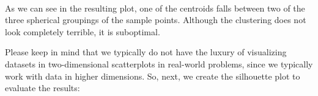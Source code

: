 \documentclass[11pt]{article}
\begin{document}
    \begin{center}
    \end{center}
    { \hspace*{\fill} \\}
    
    As we can see in the resulting plot, one of the centroids falls between
two of the three spherical groupings of the sample points. Although the
clustering does not look completely terrible, it is suboptimal.

Please keep in mind that we typically do not have the luxury of
visualizing datasets in two-dimensional scatterplots in real-world
problems, since we typically work with data in higher dimensions. So,
next, we create the silhouette plot to evaluate the results:
\end{document}
